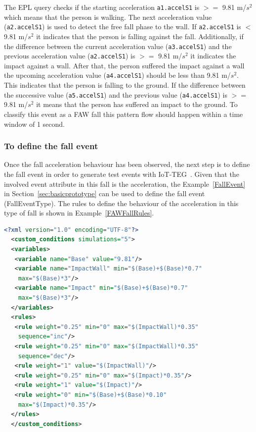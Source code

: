 \documentclass[journal]{IEEEtran}
\begin{document}
The EPL query checks if the starting acceleration \texttt{\small{a1.accelS1}} is $>=$ 9.81 m/$s^2$ which means that the person is walking. 
The next acceleration value (\texttt{\small{a2.accelS1}}) is used to detect the free fall phase to the wall. If \texttt{\small{a2.accelS1}} 
is $<$ 9.81 m/$s^2$ it indicates that the person is falling against the fall. Additionally, if the difference between 
the current acceleration value (\texttt{\small{a3.accelS1}}) and the previous acceleration value (\texttt{\small{a2.accelS1}}) is $>=$ 9.81 m/$s^2$ 
it indicates the impact against a wall. After that, the person suffered the impact against a wall the upcoming 
acceleration value (\texttt{\small{a4.accelS1}}) should be less than 9.81 m/$s^2$. This indicates that the person is falling to 
the ground. If the difference between the successive value (\texttt{\small{a5.accelS1}}) and the previous value (\texttt{\small{a4.accelS1}}) 
is $>=$ 9.81 m/$s^2$ it means that the person has suffered an impact to the ground. To classify this event as 
a FAW fall this pattern flow should happen within a time window of 1 second.

\subsubsection*{To define the fall event} Once the fall acceleration behaviour has been observed, the next step is to define the 
fall event in order to generate test events with IoT-TEG~\cite{TesisGutierrez2017,Gutierrez2017}. Given that the involved event 
attribute in this fall is the acceleration, the Example~\ref{FallEvent} in Section~\ref{sec:basicprototype} can be used to define 
the fall event (FallEventType). The rules to define the behaviour of the acceleration in this type of fall is shown in 
Example~\ref{FAWFallRules}.

\begin{lstlisting}[basicstyle=\ttfamily\scriptsize,language=XML,caption={Rules to define a FAW fall},label=FAWFallRules]
  <?xml version="1.0" encoding="UTF-8"?>
  <custom_conditions simulations="5">
  <variables>
   <variable name="Base" value="9.81"/>
   <variable name="ImpactWall" min="$(Base)+$(Base)*0.7" 
    max="$(Base)*3"/>
   <variable name="Impact" min="$(Base)+$(Base)*0.7" 
    max="$(Base)*3"/>
  </variables>
  <rules>
   <rule weight="0.25" min="0" max="$(ImpactWall)*0.35" 
    sequence="inc"/>
   <rule weight="0.25" min="0" max="$(ImpactWall)*0.35" 
    sequence="dec"/>
   <rule weight="1" value="$(ImpactWall)"/>
   <rule weight="0.25" min="0" max="$(Impact)*0.35"/>
   <rule weight="1" value="$(Impact)"/>
   <rule weight="0" min="$(Base)+$(Base)*0.10"
    max="$(Impact)*0.35"/>
  </rules>
  </custom_conditions>
\end{lstlisting}
\end{document}

